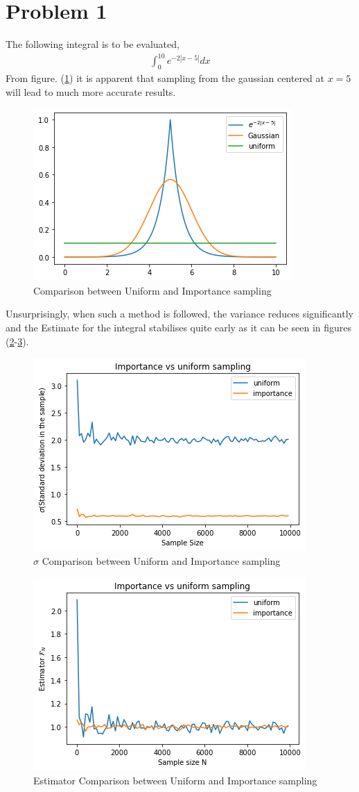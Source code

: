 \documentclass[a4paper,12pt]{article}
\begin{document}
    \section*{Problem 1}
    The following integral is to be evaluated,
    \begin{gather}
        \int_0^{10} e^{-2|x-5|} dx
    \end{gather}
    From figure. (\ref{fig:UvIsampp1}) it is apparent that sampling from the gaussian centered at $x=5$ will lead to much more accurate results.\\
    \begin{figure}[h!]
        \centering
        \includegraphics[width=0.5\linewidth]{p1_prob.png}
        \caption{\label{fig:UvIsampp1}Comparison between Uniform and Importance sampling}
    \end{figure}
    Unsurprisingly, when such a method is followed, the variance reduces significantly and the Estimate for the  integral stabilises quite early as it can be seen in figures (\ref{fig:UvIstdp1}-\ref{fig:UvIestp1}).
    \begin{figure}
        \centering
        \includegraphics[width=0.5\linewidth]{p1_stdev.png}
        \caption{\label{fig:UvIstdp1}$\sigma$ Comparison between Uniform and Importance sampling}
    \end{figure}
    \begin{figure}
        \centering
        \includegraphics[width=0.5\linewidth]{p1_est.png}
        \caption{\label{fig:UvIestp1}Estimator Comparison between Uniform and Importance sampling}
    \end{figure}
    \newpage
\end{document}
